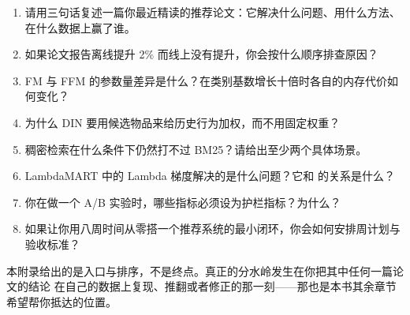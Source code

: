 \begin{interview}[本附录对应的面试题]
\begin{enumerate}
  \item 请用三句话复述一篇你最近精读的推荐论文：它解决什么问题、用什么方法、在什么数据上赢了谁。
  \item 如果论文报告离线提升 2\% 而线上没有提升，你会按什么顺序排查原因？
  \item FM 与 FFM 的参数量差异是什么？在类别基数增长十倍时各自的内存代价如何变化？
  \item 为什么 DIN 要用候选物品来给历史行为加权，而不用固定权重？
  \item 稠密检索在什么条件下仍然打不过 BM25？请给出至少两个具体场景。
  \item LambdaMART 中的 Lambda 梯度解决的是什么问题？它和  的关系是什么？
  \item 你在做一个 A/B 实验时，哪些指标必须设为护栏指标？为什么？
  \item 如果让你用八周时间从零搭一个推荐系统的最小闭环，你会如何安排周计划与验收标准？
\end{enumerate}
\end{interview}

本附录给出的是入口与排序，不是终点。真正的分水岭发生在你把其中任何一篇论文的结论
在自己的数据上复现、推翻或者修正的那一刻——那也是本书其余章节希望帮你抵达的位置。
